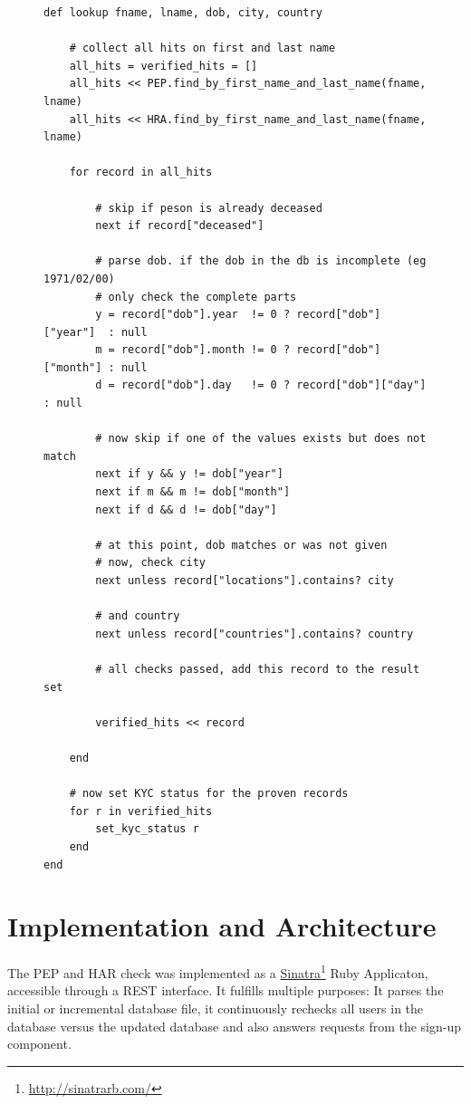 \documentclass[a4paper, oneside]{csthesis}
\newcommand\fnurl[2]{%
  \href{#2}{#1}\footnote{\url{#2}}%
}
\begin{document}
\begin{figure}
\begin{lstlisting}[caption={The Lookup algorithm},label={lst:world-check-lookup}]
def lookup fname, lname, dob, city, country

    # collect all hits on first and last name
    all_hits = verified_hits = []
    all_hits << PEP.find_by_first_name_and_last_name(fname, lname)
    all_hits << HRA.find_by_first_name_and_last_name(fname, lname)

    for record in all_hits

        # skip if peson is already deceased
        next if record["deceased"]

        # parse dob. if the dob in the db is incomplete (eg 1971/02/00)
        # only check the complete parts
        y = record["dob"].year  != 0 ? record["dob"]["year"]  : null
        m = record["dob"].month != 0 ? record["dob"]["month"] : null
        d = record["dob"].day   != 0 ? record["dob"]["day"]   : null

        # now skip if one of the values exists but does not match
        next if y && y != dob["year"]
        next if m && m != dob["month"]
        next if d && d != dob["day"]

        # at this point, dob matches or was not given
        # now, check city
        next unless record["locations"].contains? city

        # and country
        next unless record["countries"].contains? country

        # all checks passed, add this record to the result set

        verified_hits << record

    end

    # now set KYC status for the proven records
    for r in verified_hits
        set_kyc_status r
    end
end
\end{lstlisting}
\end{figure}

\section{Implementation and Architecture}

The PEP and HAR check was implemented as a \fnurl{Sinatra}{http://sinatrarb.com/} Ruby Applicaton, accessible through a REST interface. It fulfills multiple purposes: It parses the initial or incremental database file, it continuously rechecks all users in the database versus the updated database and also answers requests from the sign-up component.
\end{document}

